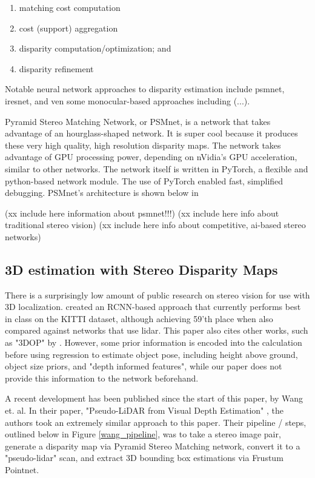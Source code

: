 \begin{enumerate} \itemsep=-0.5em
    \item matching cost computation
    \item cost (support) aggregation
    \item disparity computation/optimization; and
    \item disparity refinement
\end{enumerate}

Notable neural network approaches to disparity estimation include psmnet, iresnet, and ven some monocular-based approaches including (...). 

Pyramid Stereo Matching Network, or PSMnet, is a network that takes advantage of an hourglass-shaped network. It is super cool because it produces these very high quality, high resolution disparity maps. The network takes advantage of GPU processing power, depending on nVidia's GPU acceleration, similar to other networks. The network itself is written in PyTorch, a flexible and python-based network module. The use of PyTorch enabled fast, simplified debugging. PSMnet's architecture is shown below in 

(xx include here information about psmnet!!!)
(xx include here info about traditional stereo vision)
(xx include here info about competitive, ai-based stereo networks)




\subsection{3D estimation with Stereo Disparity Maps}
There is a surprisingly low amount of public research on stereo vision for use with 3D localization. \cite{li_stereo_2019} created an RCNN-based approach that currently performs best in class on the KITTI dataset, although achieving 59'th place when also compared against networks that use lidar. This paper also cites other works, such as "3DOP" by \cite{chen_3d_2016}. However, some prior information is encoded into the calculation before using regression to estimate object pose, including height above ground, object size priors, and "depth informed features", while our paper does not provide this information to the network beforehand.

A recent development has been published since the start of this paper, by Wang et. al. In their paper, "Pseudo-LiDAR from Visual Depth Estimation" \cite{wang_pseudo-lidar_2019}, the authors took an extremely similar approach to this paper. Their pipeline / steps, outlined below in Figure \ref{wang_pipeline}, was to take a stereo image pair, generate a disparity map via Pyramid Stereo Matching network, convert it to a "pseudo-lidar" scan, and extract 3D bounding box estimations via Frustum Pointnet. \\

